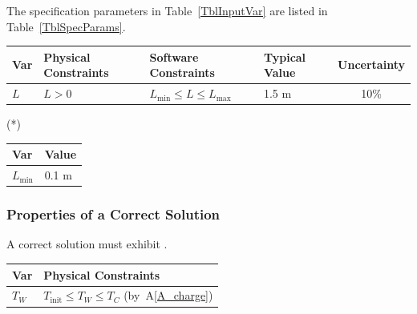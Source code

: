 \documentclass[12pt]{article}
\newcommand{\aref}[1]{A\ref{#1}}
\begin{document}
The specification parameters in Table~\ref{TblInputVar} are listed in
Table~\ref{TblSpecParams}.

\begin{table}[!h]
  \caption{Input Variables} \label{TblInputVar}
  \renewcommand{\arraystretch}{1.2}
  \noindent \begin{longtable*}{l l l l c}
    \toprule
    \textbf{Var} & \textbf{Physical Constraints} & \textbf{Software Constraints} &
    \textbf{Typical Value} & \textbf{Uncertainty}\\
    \midrule
    $L$ & $L > 0$ & $L_{\text{min}} \leq L \leq L_{\text{max}}$ & 1.5 \si[per-mode=symbol] {\metre} & 10\%
    \\
    \bottomrule
  \end{longtable*}
\end{table}

\noindent
\begin{description}
  \item[(*)] 
\end{description}

\begin{table}[!h]
  \caption{Specification Parameter Values} \label{TblSpecParams}
  \renewcommand{\arraystretch}{1.2}
  \noindent \begin{longtable*}{l l}
    \toprule
    \textbf{Var} & \textbf{Value} \\
    \midrule
    $L_\text{min}$ & 0.1 \si{\metre}\\
    \bottomrule
  \end{longtable*}
\end{table}

\subsubsection{Properties of a Correct Solution} \label{sec_CorrectSolution}

\noindent
A correct solution must exhibit .  

\begin{table}[!h]
  \caption{Output Variables} \label{TblOutputVar}
  \renewcommand{\arraystretch}{1.2}
  \noindent \begin{longtable*}{l l}
    \toprule
    \textbf{Var} & \textbf{Physical Constraints} \\
    \midrule
    $T_W$ & $T_\text{init} \leq T_W \leq T_C$ (by~\aref{A_charge})
    \\
    \bottomrule
  \end{longtable*}
\end{table}
\end{document}
